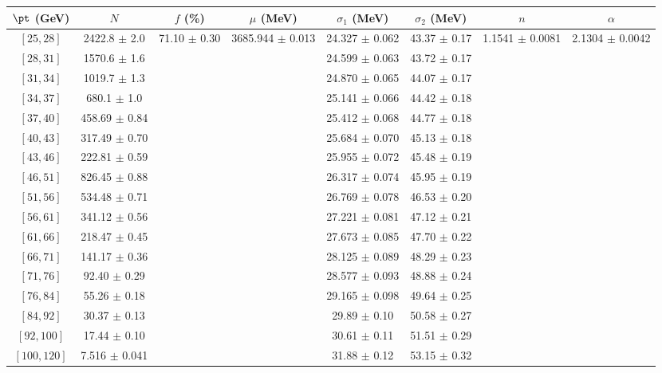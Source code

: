 \begin{tabular}{c||c|c|c|c|c|c|c}
$\pt$ (GeV) & $N$ & $f$ (\%) & $\mu$ (MeV) & $\sigma_1$ (MeV) & $\sigma_2$ (MeV) & $n$ & $\alpha$ \\
\hline
$[25, 28]$ & 2422.8 $\pm$ 2.0 & \multirow{17}{*}{71.10 $\pm$ 0.30} & \multirow{17}{*}{3685.944 $\pm$ 0.013} & 24.327 $\pm$ 0.062 & 43.37 $\pm$ 0.17 & \multirow{17}{*}{1.1541 $\pm$ 0.0081} & \multirow{17}{*}{2.1304 $\pm$ 0.0042}\\
$[28, 31]$ & 1570.6 $\pm$ 1.6 &  &  & 24.599 $\pm$ 0.063 & 43.72 $\pm$ 0.17 &  & \\
$[31, 34]$ & 1019.7 $\pm$ 1.3 &  &  & 24.870 $\pm$ 0.065 & 44.07 $\pm$ 0.17 &  & \\
$[34, 37]$ & 680.1 $\pm$ 1.0 &  &  & 25.141 $\pm$ 0.066 & 44.42 $\pm$ 0.18 &  & \\
$[37, 40]$ & 458.69 $\pm$ 0.84 &  &  & 25.412 $\pm$ 0.068 & 44.77 $\pm$ 0.18 &  & \\
$[40, 43]$ & 317.49 $\pm$ 0.70 &  &  & 25.684 $\pm$ 0.070 & 45.13 $\pm$ 0.18 &  & \\
$[43, 46]$ & 222.81 $\pm$ 0.59 &  &  & 25.955 $\pm$ 0.072 & 45.48 $\pm$ 0.19 &  & \\
$[46, 51]$ & 826.45 $\pm$ 0.88 &  &  & 26.317 $\pm$ 0.074 & 45.95 $\pm$ 0.19 &  & \\
$[51, 56]$ & 534.48 $\pm$ 0.71 &  &  & 26.769 $\pm$ 0.078 & 46.53 $\pm$ 0.20 &  & \\
$[56, 61]$ & 341.12 $\pm$ 0.56 &  &  & 27.221 $\pm$ 0.081 & 47.12 $\pm$ 0.21 &  & \\
$[61, 66]$ & 218.47 $\pm$ 0.45 &  &  & 27.673 $\pm$ 0.085 & 47.70 $\pm$ 0.22 &  & \\
$[66, 71]$ & 141.17 $\pm$ 0.36 &  &  & 28.125 $\pm$ 0.089 & 48.29 $\pm$ 0.23 &  & \\
$[71, 76]$ & 92.40 $\pm$ 0.29 &  &  & 28.577 $\pm$ 0.093 & 48.88 $\pm$ 0.24 &  & \\
$[76, 84]$ & 55.26 $\pm$ 0.18 &  &  & 29.165 $\pm$ 0.098 & 49.64 $\pm$ 0.25 &  & \\
$[84, 92]$ & 30.37 $\pm$ 0.13 &  &  & 29.89 $\pm$ 0.10 & 50.58 $\pm$ 0.27 &  & \\
$[92, 100]$ & 17.44 $\pm$ 0.10 &  &  & 30.61 $\pm$ 0.11 & 51.51 $\pm$ 0.29 &  & \\
$[100, 120]$ & 7.516 $\pm$ 0.041 &  &  & 31.88 $\pm$ 0.12 & 53.15 $\pm$ 0.32 &  & \\
\end{tabular}
